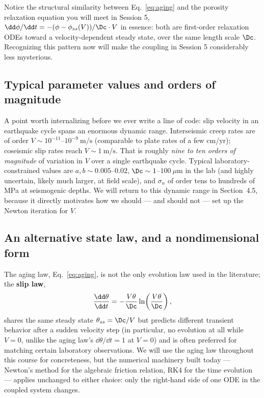 \begin{remark}
Notice the structural similarity between Eq.~\eqref{eq:aging} and the porosity relaxation equation you will meet in Session 5, $\dd\phi/\dd t = -(\phi - \phi_{ss}(V))/\Dc \cdot V$ in essence: both are first-order relaxation ODEs toward a velocity-dependent steady state, over the same length scale $\Dc$. Recognizing this pattern now will make the coupling in Session 5 considerably less mysterious.
\end{remark}

\subsection{Typical parameter values and orders of magnitude}

A point worth internalizing before we ever write a line of code: slip velocity in an earthquake cycle spans an enormous dynamic range. Interseismic creep rates are of order $V \sim 10^{-11}$--$10^{-9}\ \mathrm{m/s}$ (comparable to plate rates of a few cm/yr); coseismic slip rates reach $V \sim 1\ \mathrm{m/s}$. That is roughly \emph{nine to ten orders of magnitude} of variation in $V$ over a single earthquake cycle. Typical laboratory-constrained values are $a, b \sim 0.005$--$0.02$, $\Dc \sim 1$--$100\ \mu\mathrm{m}$ in the lab (and highly uncertain, likely much larger, at field scale), and $\sigma_n$ of order tens to hundreds of MPa at seismogenic depths. We will return to this dynamic range in Section~4.5, because it directly motivates how we should --- and should not --- set up the Newton iteration for $V$.

\subsection{An alternative state law, and a nondimensional form}

The aging law, Eq.~\eqref{eq:aging}, is not the only evolution law used in the literature; the \textbf{slip law},
\begin{equation}
\frac{\dd \theta}{\dd t} = -\frac{V\theta}{\Dc}\ln\!\left(\frac{V\theta}{\Dc}\right),
\end{equation}
shares the same steady state $\theta_{ss}=\Dc/V$ but predicts different transient behavior after a sudden velocity step (in particular, no evolution at all while $V=0$, unlike the aging law's $\dd\theta/\dd t = 1$ at $V=0$) and is often preferred for matching certain laboratory observations. We will use the aging law throughout this course for concreteness, but the numerical machinery built today --- Newton's method for the algebraic friction relation, RK4 for the time evolution --- applies unchanged to either choice: only the right-hand side of one ODE in the coupled system changes.

